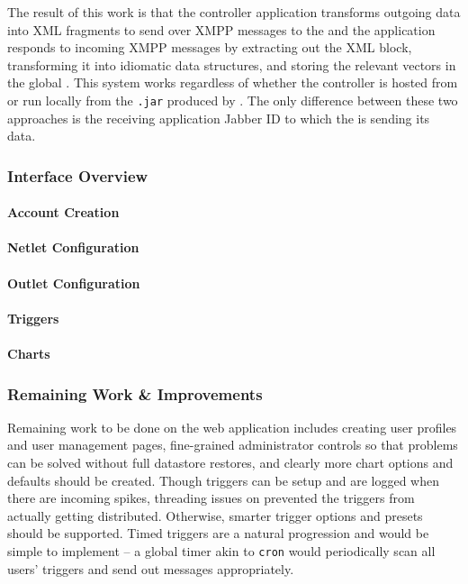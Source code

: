 The result of this work is that the \netlet \clojure controller application transforms outgoing data into XML fragments to send over XMPP messages to the \netlet and the application responds to incoming XMPP messages by extracting out the XML block, transforming it into idiomatic \clojure data structures, and storing the relevant vectors in the global \umap.  This system works regardless of whether the controller is hosted from \gae or run locally from the \texttt{.jar} produced by \lein. The only difference between these two approaches is the receiving application Jabber ID to which the \netlet is sending its data.\\

\subsubsection{Interface Overview}

\paragraph{Account Creation}
\paragraph{Netlet Configuration}
\paragraph{Outlet Configuration}
\paragraph{Triggers}
\paragraph{Charts}


\subsubsection{Remaining Work \& Improvements}

Remaining work to be done on the \clojure web application includes creating user profiles and user management pages, fine-grained administrator controls so that \umap problems can be solved without full datastore restores, and clearly more chart options and defaults should be created.  Though triggers can be setup and are logged when there are incoming spikes, threading issues on \aengn prevented the triggers from actually getting distributed.  Otherwise, smarter trigger options and presets should be supported.  Timed triggers are a natural progression and would be simple to implement -- a global timer akin to \texttt{cron} would periodically scan all users' triggers and send out messages appropriately.\\


